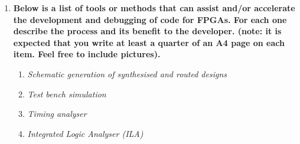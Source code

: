 \documentclass[11pt]{article}
\begin{document}
\begin{preview}
\begin{enumerate}
  \item \textbf{Below is a list of tools or methods that can assist and/or accelerate the development and debugging of code for FPGAs. For each one describe the process and its benefit to the developer. (note: it is expected that you write at least a quarter of an A4 page on each item. Feel free to include pictures).}
  \begin{enumerate}
    \item \textit{Schematic generation of synthesised and routed designs}
    \item \textit{Test bench simulation}
    \item \textit{Timing analyser}
    \item \textit{Integrated Logic Analyser (ILA)}
  \end{enumerate}



\end{enumerate}
\end{preview}
\end{document}
